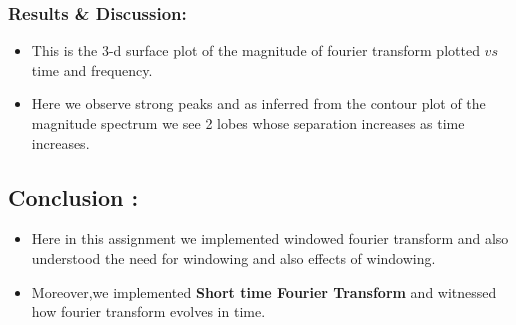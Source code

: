 \documentclass[10pt,a4paper]{article}
\providecommand{\tightlist}{%
      \setlength{\itemsep}{0pt}\setlength{\parskip}{0pt}}
\begin{document}
	
		
    \subsubsection{Results \& Discussion:}\label{results-discussion}

\begin{itemize}
\tightlist
\item
  This is the 3-d surface plot of the magnitude of fourier transform
  plotted \(vs\) time and frequency.
\item
  Here we observe strong peaks and as inferred from the contour plot of
  the magnitude spectrum we see 2 lobes whose separation increases as
  time increases.
\end{itemize}

	

	
		
    \subsection{Conclusion :}\label{conclusion}

\begin{itemize}
\tightlist
\item
  Here in this assignment we implemented windowed fourier transform and
  also understood the need for windowing and also effects of windowing.
\item
  Moreover,we implemented \textbf{Short time Fourier Transform} and
  witnessed how fourier transform evolves in time.
\end{itemize}

	


    
    
    
    
\end{document}
